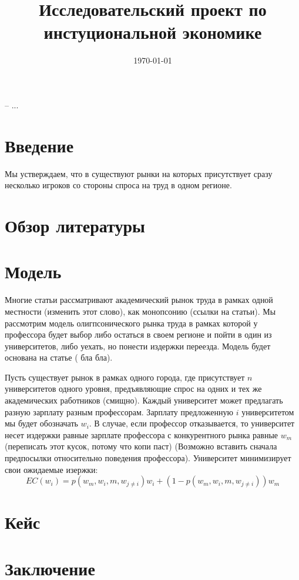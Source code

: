 \documentclass[a4paper, 12pt]{article}
\title{Исследовательский проект по инстуциональной экономике}
\date{\today}
\theoremstyle{definition}
\theoremstyle{plain}
\begin{document}
\maketitle

-- ...

\section{Введение}
Мы устверждаем, что в существуют рынки на которых присутствует сразу несколько игроков со стороны спроса на труд в одном регионе. 
\section{Обзор литературы}

\section{Модель}

Многие статьи рассматривают академический рынок труда в рамках одной местности (изменить этот слово), как монопсонию (ссылки на статьи). Мы рассмотрим модель олигпсонического рынка труда в рамках которой у профессора будет выбор либо остаться в своем регионе и пойти в один из университетов, либо уехать, но понести издержки переезда. Модель будет основана на статье ( бла бла). 

Пусть существует рынок в рамках одного города, где присутствует $n$ университетов одного уровня, предъявляющие спрос на одних и тех же академических работников (смищно). Каждый университет может предлагать разную зарплату разным профессорам. Зарплату предложенную $i$ университетом мы будет обозначать $w_i$. В случае, если профессор отказывается, то университет несет издержки равные зарплате профессора с конкурентного рынка равные $w_m$ (переписать этот кусок, потому что копи паст) (Возможно вставить сначала предпосылки относительно поведения профессора). Университет минимизирует свои ожидаемые изержки: 
\[
EC(w_i) = p(w_m, w_i, m, w_{j \neq i})w_i + (1 - p(w_m, w_i, m, w_{j \neq i}))w_m
\]



\section{Кейс}

\section{Заключение}
\end{document}
